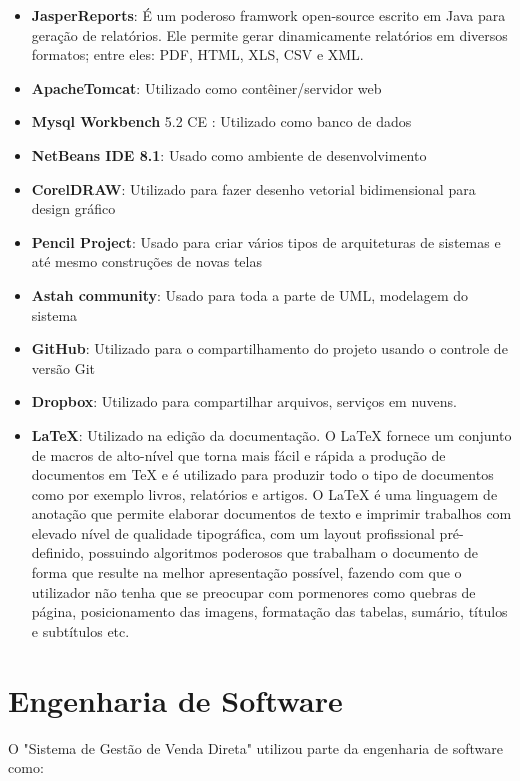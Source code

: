 \documentclass[chapter=TITLE,12pt,oneside,a4paper,english,french,sumario=tradicional,spanish,brazil,]{abntex2}
\begin{document}
\begin{itemize}
\item	 \textbf{JasperReports}: É um poderoso framwork open-source escrito em Java para geração de relatórios. Ele permite gerar dinamicamente relatórios em diversos formatos; entre eles: PDF, HTML, XLS, CSV e XML.

\item	\textbf{ApacheTomcat}: Utilizado  como contêiner/servidor web

\item	\textbf{Mysql Workbench} 5.2 CE : Utilizado como banco de dados

\item	\textbf{NetBeans IDE 8.1}: Usado como ambiente de desenvolvimento

\item	\textbf{CorelDRAW}: Utilizado para fazer desenho vetorial bidimensional para design gráfico

\item	\textbf{Pencil Project}: Usado para criar vários tipos de arquiteturas de sistemas e até mesmo construções de novas telas

\item	\textbf{Astah community}: Usado para toda a parte de UML, modelagem do sistema

\item	\textbf{GitHub}: Utilizado para o compartilhamento do projeto usando o controle de versão Git

\item	\textbf{Dropbox}: Utilizado para compartilhar arquivos, serviços em nuvens.

\item    \textbf{LaTeX}: Utilizado na edição da documentação.
O LaTeX fornece um conjunto de macros de alto-nível que torna mais fácil e rápida a produção de documentos em TeX e é utilizado para produzir todo o tipo de documentos como por exemplo livros, relatórios e artigos.
O LaTeX é  uma linguagem de anotação que permite elaborar documentos de texto e imprimir trabalhos com elevado nível de qualidade tipográfica,
com um layout profissional pré-definido, possuindo algoritmos poderosos que trabalham o documento de forma que resulte na melhor apresentação  possível,
fazendo com que o utilizador não tenha que se preocupar com pormenores como quebras de página, posicionamento das imagens, formatação das tabelas, sumário, títulos e subtítulos etc.
\end{itemize}

\section{Engenharia de Software}
O "Sistema de Gestão de Venda Direta" utilizou parte da engenharia de software como:
\end{document}

